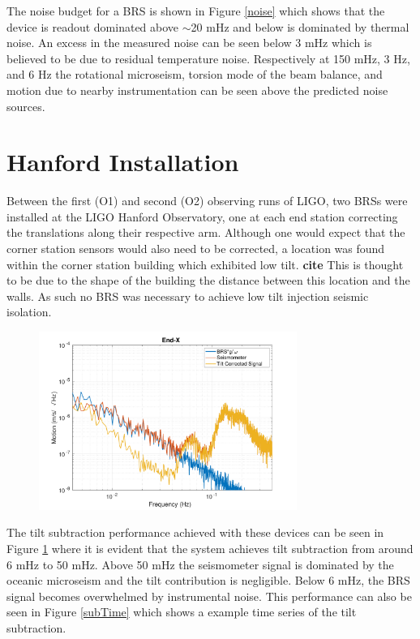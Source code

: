 \documentclass [12pt, proquest]{uwthesis}[2019]
\begin{document}
 The noise budget for a BRS is shown in Figure \ref{noise} which shows that the device is readout dominated above $\sim$20 mHz and below is dominated by thermal noise. An excess in the measured noise can be seen below 3 mHz which is believed to be due to residual temperature noise. Respectively at 150 mHz, 3 Hz, and 6 Hz the rotational microseism, torsion mode of the beam balance, and motion due to nearby instrumentation can be seen above the predicted noise sources.

\section{Hanford Installation} \label{BRS_Hanford}

\quad Between the first (O1) and second (O2) observing runs of LIGO, two BRSs were installed at the LIGO Hanford Observatory, one at each end station correcting the translations along their respective arm. Although one would expect that the corner station sensors would also need to be corrected, a location was found within the corner station building which exhibited low tilt. \textbf{cite} This is thought to be due to the shape of the building the distance between this location and the walls. As such no BRS was necessary to achieve low tilt injection seismic isolation.

\begin{figure}%
\begin{center}
\includegraphics[width=0.75\textwidth]{HSubtractionETMX.pdf}
\caption{}
\label{sub}
\end{center}
\end{figure}

The tilt subtraction performance achieved with these devices can be seen in Figure \ref{sub} where it is evident that the system achieves tilt subtraction from around 6 mHz to 50 mHz. Above 50 mHz the seismometer signal is dominated by the oceanic microseism and the tilt contribution is negligible. Below 6 mHz, the BRS signal becomes overwhelmed by instrumental noise. This performance can also be seen in Figure \ref{subTime} which shows a example time series of the tilt subtraction. 
\end{document}
